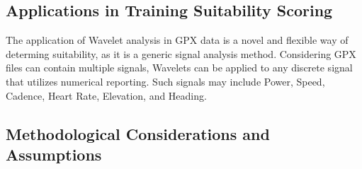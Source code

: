 \documentclass[12pt,a4paper]{report}
\begin{document}
\subsection{Applications in Training Suitability Scoring}

The application of Wavelet analysis in GPX data is a novel and flexible way of determing suitability, as it is a generic signal analysis method. Considering GPX files can
contain multiple signals, Wavelets can be applied to any discrete signal that utilizes numerical reporting. Such signals may include Power, Speed, Cadence, Heart Rate, Elevation, and Heading.


\subsection{Methodological Considerations and Assumptions}
\end{document}
